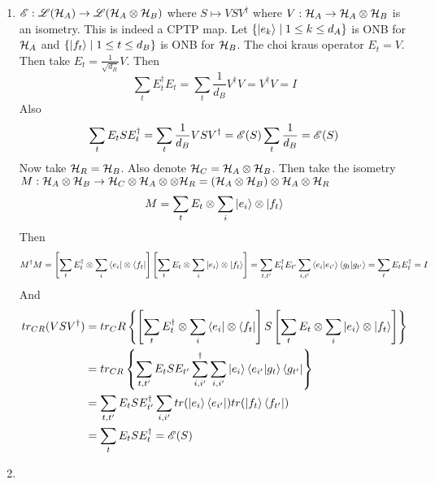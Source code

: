 \documentclass[a4paper, 11pt]{article}
\begin{document}
{\begin{enumerate}[label=(\arabic*)]
	\item ${\mathscr{E}}:{\mathscr{L}}(\mathcal{H}_A)\to {\mathscr{L}}(\mathcal{H}_A\otimes \mathcal{H}_B)$ where $S\mapsto VSV^{\dagger}$ where $V:\mathcal{H}_A\to\mathcal{H}_A\otimes \mathcal{H}_B$ is an isometry.  This is indeed a CPTP map.  Let $\{\ket{e_k}\mid 1\leq k\leq d_A\}$ is ONB for $\mathcal{H}_A$ and $\{\ket{f_t}\mid 1\leq t\leq d_B\}$ is ONB for $\mathcal{H}_B$. The choi kraus operator $E_t=V$. Then take $E_t=\frac1{\sqrt{d_B}}V$. Then $$\sum_{t}E_t^{\dagger}E_t=\sum_t\frac1{d_B}V^{\dagger}V=V^{\dagger}V=I$$Also $$\sum_tE_tSE_t^{\dagger}=\sum_t\frac1{d_B}VSV^{\dagger}={\mathscr{E}}(S)\sum_t\frac1{d_B}={\mathscr{E}}(S)$$Now take $\mathcal{H}_R=\mathcal{H}_B$. Also denote $\mathcal{H}_C=\mathcal{H}_A\otimes \mathcal{H}_B$.  Then take the isometry $M:\mathcal{H}_A\otimes \mathcal{H}_B\to \mathcal{H}_C\otimes \mathcal{H}_A\otimes \otimes \mathcal{H}_R=(\mathcal{H}_A\otimes \mathcal{H}_B)\otimes \mathcal{H}_A\otimes \mathcal{H}_R$ $$M=\sum_tE_t\otimes \sum_i\ket{e_i}\otimes \ket{f_t}$$Then $$M^{\dagger}M=\left[ \sum_tE_t^{\dagger}\otimes \sum_i\bra{e_i}\otimes \bra{f_t} \right]\left[\sum_tE_t\otimes \sum_i\ket{e_i}\otimes \ket{f_t}  \right]=\sum_{t,t'}E_t^{\dagger}E_{t'}\sum_{i,i'}\bra{e_i}\ket{e_{i'}}\bra{g_t}\ket{g_{t'}}=\sum_tE_tE_t^{\dagger}=I$$And\begin{align*}
			tr_{CR}(VSV^{\dagger}) & = tr_CR\left\{\left[ \sum_tE_t^{\dagger}\otimes \sum_i\bra{e_i}\otimes \bra{f_t} \right]S\left[\sum_tE_t\otimes \sum_i\ket{e_i}\otimes \ket{f_t}  \right]   \right\}\\
			& = tr_{CR}\left\{   \sum_{t,t'}E_tSE_{t'}\sum_{i,i'}^{\dagger}\sum_{i,i'}\ket{e_i}\bra{e_{i'}}\ket{g_t}\bra{g_{t'}}  \right\}\\
			& = \sum_{t,t'} E_tSE_{t'}^{\dagger}\sum_{i,i'}tr(\ket{e_i}\bra{e_{i'}}) tr(\ket{f_t}\bra{f_{t'}})\\
			& = \sum_tE_tSE_t^{\dagger}={\mathscr{E}}(S)
	\end{align*}
\item
	
	
	

\end{enumerate}}
\end{document}
